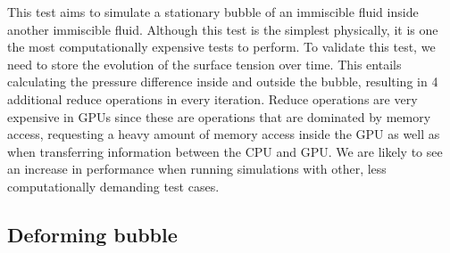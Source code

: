 \documentclass[12pt, openany]{book}
\begin{document}
This test aims to simulate a stationary bubble of an immiscible fluid inside another immiscible fluid. Although this test is the simplest physically, it is one the most computationally expensive tests to perform. To validate this test, we need to store the evolution of the surface tension over time. This entails calculating the pressure difference inside and outside the bubble, resulting in 4 additional reduce operations in every iteration. Reduce operations are very expensive in GPUs since these are operations that are dominated by memory access, requesting a heavy amount of memory access inside the GPU as well as when transferring information between the CPU and GPU. We are likely to see an increase in performance when running simulations with other, less computationally demanding test cases. 
\subsection{Deforming bubble}
\end{document}

